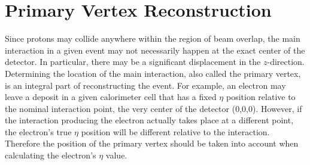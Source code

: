 \section{Primary Vertex Reconstruction} %
\label{evReco:PV}

Since protons may collide anywhere within the region of 
beam overlap, 
the main interaction in a given event may not necessarily 
happen at the exact center of the detector.  
In particular, there may be a significant displacement 
in the $z$-direction.  
Determining the location of the main interaction, 
also called the primary vertex, 
is an integral part of reconstructing the event.  
For example, an electron may leave a deposit in 
a given calorimeter cell that has a fixed $\eta$ position 
relative to the nominal interaction point, 
the very center of the detector (0,0,0).  
However, if the interaction producing the electron 
actually takes place at a different point, 
the electron's true $\eta$ position will be 
different relative to the interaction.  
Therefore the position of the primary vertex 
should be taken into account when calculating 
the electron's $\eta$ value.  


